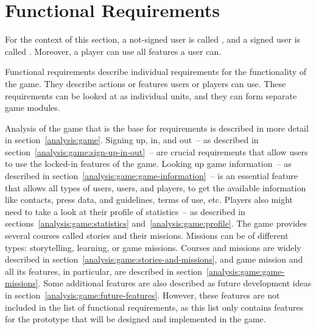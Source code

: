 \section{Functional Requirements}

For the context of this section, a not-signed user is called , and a signed user is called .
Moreover, a player can use all features a user can. 

Functional requirements describe individual requirements for the functionality of the game.
They describe actions or features users or players can use.
These requirements can be looked at as individual units, and they can form separate game modules.

Analysis of the game that is the base for requirements is described in more detail in section~\ref{analysis:game}.
Signing up, in, and out~-- as described in section~\ref{analysis:game:sign-up-in-out}~-- are crucial requirements that allow users to use the locked-in features of the game.
Looking up game information~-- as described in section~\ref{analysis:game:game-information}~-- is an essential feature that allows all types of users, users, and players, to get the available information like contacts, press data, and guidelines, terms of use, etc.
Players also might need to take a look at their profile of statistics~-- as described in sections~\ref{analysis:game:statistics} and~\ref{analysis:game:profile}.
The game provides several courses called stories and their missions.
Missions can be of different types: storytelling, learning, or game missions.
Courses and missions are widely described in section~\ref{analysis:game:stories-and-missions}, and game mission and all its features, in particular, are described in section~\ref{analysis:game:game-missions}.
Some additional features are also described as future development ideas in section~\ref{analysis:game:future-features}.
However, these features are not included in the list of functional requirements, as this list only contains features for the prototype that will be designed and implemented in the game.

